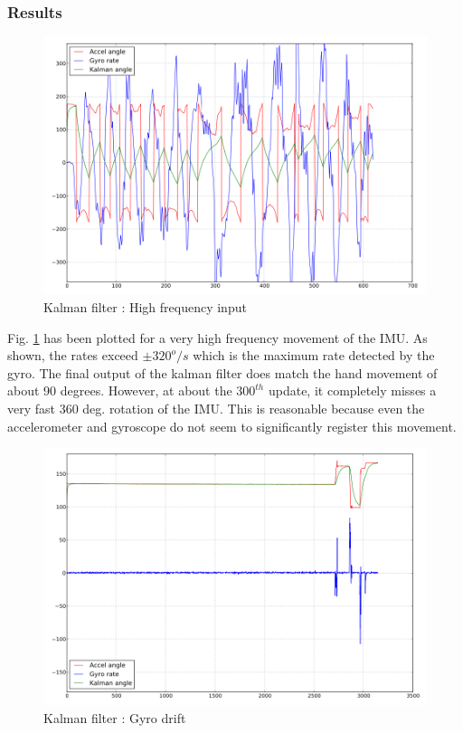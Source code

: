 \subsubsection{Results}
\begin{figure}[!h]
\centering
\includegraphics[scale=1.4]{fig/kalman_highfreq.pdf}
\caption{Kalman filter : High frequency input}
\label{fig:5_kalman_highfreq}
\end{figure}
Fig. \ref{fig:5_kalman_highfreq} has been plotted for a very high frequency movement of the IMU. As shown, the rates exceed 
$\pm320^o/s$ which is the maximum rate detected by the gyro. The final output of the kalman filter does match the hand movement
of about 90 degrees. However, at about the $300^{th}$ update, it completely misses a very fast 360 deg. rotation of the IMU. This
is reasonable because even the accelerometer and gyroscope do not seem to significantly register this movement.

\begin{figure}[!h]
\centering
\includegraphics[scale=1.4]{fig/kalman_drift.pdf}
\caption{Kalman filter : Gyro drift}
\label{fig:5_kalman_gyrodrift}
\end{figure}

